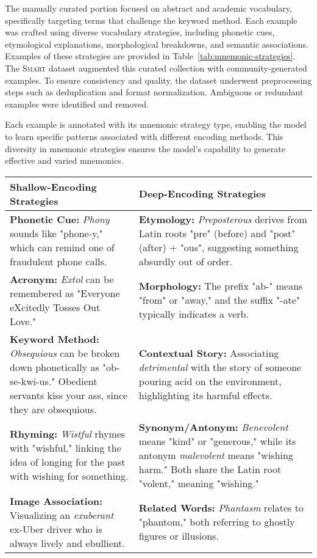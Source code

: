 \documentclass{article}
\begin{document}
The manually curated portion focused on abstract and academic vocabulary, specifically targeting terms that challenge the keyword method. Each example was crafted using diverse vocabulary strategies, including phonetic cues, etymological explanations, morphological breakdowns, and semantic associations. Examples of these strategies are provided in Table~\ref{tab:mnemonic-strategies}. The \textsc{Smart} dataset augmented this curated collection with community-generated examples. To ensure consistency and quality, the dataset underwent preprocessing steps such as deduplication and format normalization. Ambiguous or redundant examples were identified and removed.

Each example is annotated with its mnemonic strategy type, enabling the model to learn specific patterns associated with different encoding methods. This diversity in mnemonic strategies ensures the model's capability to generate effective and varied mnemonics.

\begin{table*}[ht]
\centering
\begin{tabular}{p{} p{}}
\textbf{Shallow-Encoding Strategies} & \textbf{Deep-Encoding Strategies} \\
\hline
\textbf{Phonetic Cue:} \textit{Phony} sounds like "phone-y," which can remind one of fraudulent phone calls. & \textbf{Etymology:} \textit{Preposterous} derives from Latin roots "pre" (before) and "post" (after) + "ous", suggesting something absurdly out of order. \\
\textbf{Acronym:} \textit{Extol} can be remembered as "Everyone eXcitedly Tosses Out Love." & \textbf{Morphology:} The prefix "ab-" means "from" or "away," and the suffix "-ate" typically indicates a verb. \\
\textbf{Keyword Method:} \textit{Obsequious} can be broken down phonetically as "ob-se-kwi-us." Obedient servants kiss your ass, since they are obsequious. & \textbf{Contextual Story:} Associating \textit{detrimental} with the story of someone pouring acid on the environment, highlighting its harmful effects. \\
\textbf{Rhyming:} \textit{Wistful} rhymes with "wishful," linking the idea of longing for the past with wishing for something. & \textbf{Synonym/Antonym:} \textit{Benevolent} means "kind" or "generous," while its antonym \textit{malevolent} means "wishing harm." Both share the Latin root "volent," meaning "wishing." \\
\textbf{Image Association:} Visualizing an \textit{exuberant} ex-Uber driver who is always lively and ebullient. & \textbf{Related Words:} \textit{Phantasm} relates to "phantom," both referring to ghostly figures or illusions. \\
\end{tabular}
\caption{Examples of Mnemonic Strategies for Vocabulary Learning}
\label{tab:mnemonic-strategies}
\end{table*}
\end{document}
